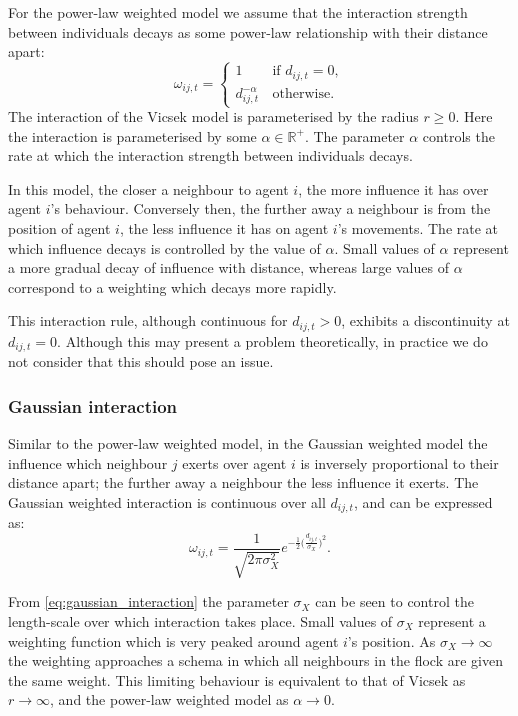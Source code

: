 For the power-law weighted model we assume that the interaction strength between
individuals decays as some power-law relationship with their distance apart:
\begin{equation}
    \label{eq:power_law_interaction}
	\omega_{ij,t} =
	\begin{cases}
		1                  & \, \text{if } d_{ij,t} = 0, \\
		d_{ij,t}^{-\alpha} & \, \text{otherwise}.
	\end{cases}
\end{equation}
The interaction of the Vicsek model is parameterised by the radius $r \geq 0$. Here the
interaction is parameterised by some $\alpha\in\mathbb{R}^+$. The parameter $\alpha$
controls the rate at which the interaction strength between individuals decays. 

In this model, the closer a neighbour to agent $i$, the more influence it has over agent
$i$'s behaviour. Conversely then, the further away a neighbour is from the position of
agent $i$, the less influence it has on agent $i$'s movements. The rate at which influence
decays is controlled by the value of $\alpha$. Small values of $\alpha$ represent a more
gradual decay of influence with distance, whereas large values of $\alpha$ correspond to a
weighting which decays more rapidly.

This interaction rule, although continuous for $d_{ij,t} > 0$, exhibits a discontinuity at
$d_{ij,t}=0$. Although this may present a problem theoretically, in practice we do not
consider that this should pose an issue.

\subsubsection{Gaussian interaction}

Similar to the power-law weighted model, in the Gaussian weighted model the influence
which neighbour $j$ exerts over agent $i$ is inversely proportional to their distance
apart; the further away a neighbour the less influence it exerts. The Gaussian weighted
interaction is continuous over all $d_{ij,t}$, and can be expressed as:
\begin{equation}
    \label{eq:gaussian_interaction}
	\omega_{ij,t} =
	\frac{1}{\sqrt{2\pi\sigma_X^2}}
	e^{-\frac{1}{2}\big(\frac{d_{ij,t}}{\sigma_X}\big)^2}.
\end{equation}

From \cref{eq:gaussian_interaction} the parameter $\sigma_X$ can be seen to control the
length-scale over which interaction takes place. Small values of $\sigma_X$ represent a
weighting function which is very peaked around agent $i$'s position. As $\sigma_X
\rightarrow \infty$ the weighting approaches a schema in which all neighbours in the flock
are given the same weight. This limiting behaviour is equivalent to that of Vicsek as
$r\rightarrow\infty$, and the power-law weighted model as $\alpha\rightarrow0$.

